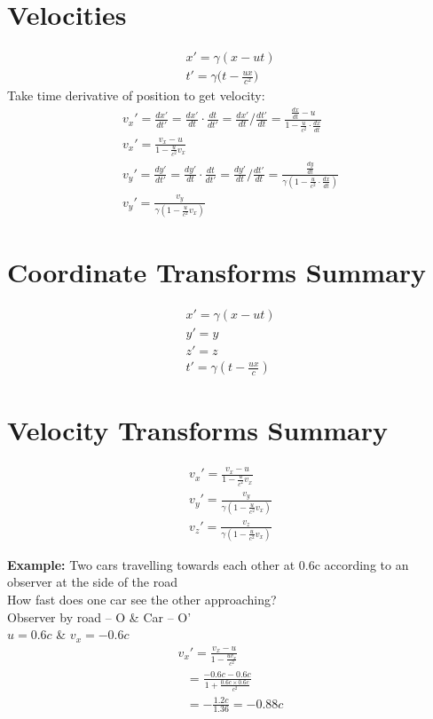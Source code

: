 \documentclass[a4paper, 11pt, fleqn, normalem]{report}
\begin{document}
\section{Velocities}
\vspace{-24pt}
\begin{gather*}
    x' = \gamma(x - ut) \\
    t' = \gamma\Big(t - \frac{ux}{c^{2}}\Big)
\end{gather*}
Take time derivative of position to get velocity:
\begin{gather*}
    v_{x}' = \frac{dx'}{dt'} = \frac{dx'}{dt}\cdot\frac{dt}{dt'} = \frac{dx'}{dt}\Big/\frac{dt'}{dt} = \frac{\tfrac{dx}{dt} - u}{1 - \tfrac{u}{c^{2}}\cdot\tfrac{dx}{dt}} \\
    v_{x}' = \frac{v_{x} - u}{1 - \tfrac{u}{c^{2}}v_{x}} \\
    v_{y}' = \frac{dy'}{dt'} = \frac{dy'}{dt}\cdot\frac{dt}{dt'} = \frac{dy'}{dt}\Big/\frac{dt'}{dt} = \frac{\tfrac{dy}{dt}}{\gamma(1 - \tfrac{u}{c^{2}}\cdot\tfrac{dx}{dt})} \\
    v_{y}' = \frac{v_{y}}{\gamma(1 - \tfrac{u}{c^{2}}v_{x})}
\end{gather*}

\section{Coordinate Transforms Summary}
\vspace{-24pt}
\begin{gather*}
    x' = \gamma(x - ut) \\
    y' = y \\
    z' = z \\
    t' = \gamma(t - \frac{ux}{c})
\end{gather*}

\section{Velocity Transforms Summary}
\vspace{-24pt}
\begin{gather*}
    v_{x}' = \frac{v_{x} - u}{1 - \tfrac{u}{c^{2}}v_{x}} \\
    v_{y}' = \frac{v_{y}}{\gamma(1 - \tfrac{u}{c^{2}}v_{x})} \\
    v_{z}' = \frac{v_{z}}{\gamma(1 - \tfrac{u}{c^{2}}v_{x})}
\end{gather*}

\textbf{Example: }Two cars travelling towards each other at 0.6c according to an observer at the side of the road \\
How fast does one car see the other approaching? \\
Observer by road -- O \& Car -- O' \\
$u = 0.6c$ \& $v_{x} = -0.6c$
\begin{gather*}
    v_{x}' = \frac{v_{x} - u}{1 - \tfrac{uv_{x}}{c^{2}}} \\
    ~~~ = \frac{-0.6c - 0.6c}{1 + \tfrac{0.6c\times0.6c}{c^{2}}} \\
    ~~~ = -\frac{1.2c}{1.36} = -0.88c
\end{gather*}
\end{document}
